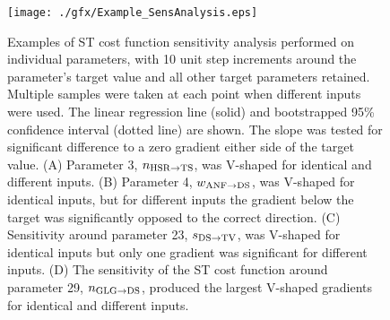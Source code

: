 
% 




 \begin{figure}[thp!]
   \centering
   \texttt{[image: ./gfx/Example\_SensAnalysis.eps]}  
  \caption{Examples of ST cost function sensitivity analysis
    performed on individual parameters, with 10 unit step increments
    around the parameter's target value and all other target
    parameters retained. Multiple samples were taken at each point
    when different inputs were used. The linear regression line
    (solid) and bootstrapped 95\% confidence interval (dotted line)
    are shown. The slope was tested for significant difference to a
    zero gradient either side of the target value. (A) Parameter 3,
    $n_{{\rm HSR}\to {\rm TS}} $, was V-shaped for identical and
    different inputs. (B) Parameter 4, $w_{{\rm ANF}\to {\rm DS}} $,
    was V-shaped for identical inputs, but for different inputs the
    gradient below the target was significantly opposed to the
    correct direction. (C) Sensitivity around parameter 23, $s_{{\rm
        DS}\to {\rm TV}} $, was V-shaped for identical inputs but
    only one gradient was significant for different inputs. (D) The
    sensitivity of the ST cost function around parameter 29,
    $n_{{\rm GLG}\to {\rm DS}} $, produced the largest V-shaped
    gradients for identical and different inputs.}
  \label{fig:12}
\end{figure}



